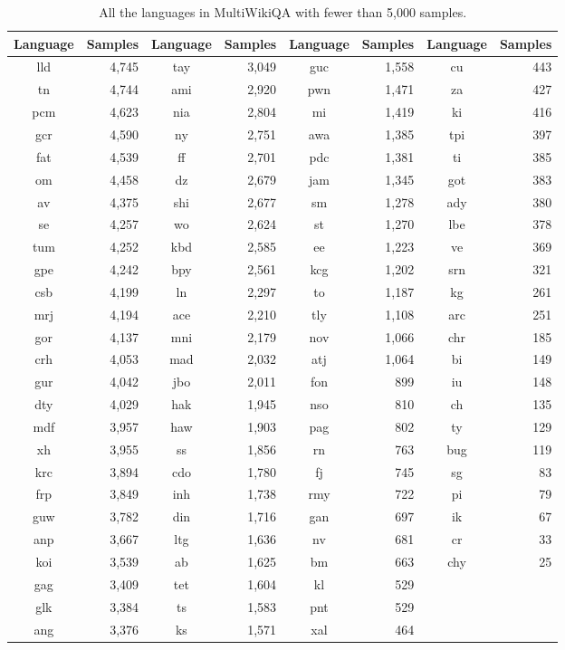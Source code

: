 \documentclass[10pt, a4paper]{article}
\begin{document}
\begin{table}[h]
    \centering
    \scriptsize
    \begin{tabular}{cr|cr|cr|cr}
        \hline
        \textbf{Language} & \textbf{Samples} & \textbf{Language} & \textbf{Samples} & \textbf{Language} & \textbf{Samples} & \textbf{Language} & \textbf{Samples} \\
        \hline
        lld & 4,745 & tay & 3,049 & guc & 1,558 & cu & 443 \\
        tn & 4,744 & ami & 2,920 & pwn & 1,471 & za & 427 \\
        pcm & 4,623 & nia & 2,804 & mi & 1,419 & ki & 416 \\
        gcr & 4,590 & ny & 2,751 & awa & 1,385 & tpi & 397 \\
        fat & 4,539 & ff & 2,701 & pdc & 1,381 & ti & 385 \\
        om & 4,458 & dz & 2,679 & jam & 1,345 & got & 383 \\
        av & 4,375 & shi & 2,677 & sm & 1,278 & ady & 380 \\
        se & 4,257 & wo & 2,624 & st & 1,270 & lbe & 378 \\
        tum & 4,252 & kbd & 2,585 & ee & 1,223 & ve & 369 \\
        gpe & 4,242 & bpy & 2,561 & kcg & 1,202 & srn & 321 \\
        csb & 4,199 & ln & 2,297 & to & 1,187 & kg & 261 \\
        mrj & 4,194 & ace & 2,210 & tly & 1,108 & arc & 251 \\
        gor & 4,137 & mni & 2,179 & nov & 1,066 & chr & 185 \\
        crh & 4,053 & mad & 2,032 & atj & 1,064 & bi & 149 \\
        gur & 4,042 & jbo & 2,011 & fon & 899 & iu & 148 \\
        dty & 4,029 & hak & 1,945 & nso & 810 & ch & 135 \\
        mdf & 3,957 & haw & 1,903 & pag & 802 & ty & 129 \\
        xh & 3,955 & ss & 1,856 & rn & 763 & bug & 119 \\
        krc & 3,894 & cdo & 1,780 & fj & 745 & sg & 83 \\
        frp & 3,849 & inh & 1,738 & rmy & 722 & pi & 79 \\
        guw & 3,782 & din & 1,716 & gan & 697 & ik & 67 \\
        anp & 3,667 & ltg & 1,636 & nv & 681 & cr & 33 \\
        koi & 3,539 & ab & 1,625 & bm & 663 & chy & 25 \\
        gag & 3,409 & tet & 1,604 & kl & 529 &&\\
        glk & 3,384 & ts & 1,583 & pnt & 529 &&\\
        ang & 3,376 & ks & 1,571 & xal & 464 &&
    \end{tabular}
    \caption{All the languages in MultiWikiQA with fewer than 5,000 samples.}
    \label{tab:num-samples-in-small-subsets}
\end{table}
\end{document}
